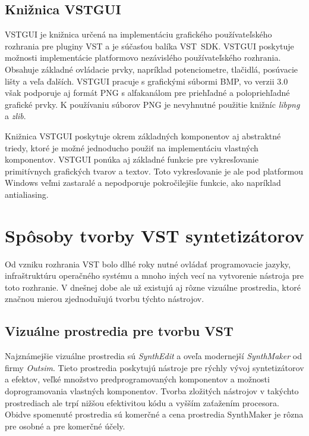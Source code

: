 \subsection{Knižnica VSTGUI}
VSTGUI je knižnica určená na implementáciu grafického používateľského rozhrania pre pluginy VST a je súčasťou balíka VST~SDK. VSTGUI poskytuje možnosti implementácie platformovo nezávislého používateľského rozhrania. Obsahuje základné ovládacie prvky, napríklad potenciometre, tlačidlá, posúvacie lišty a veľa ďalších. VSTGUI pracuje s grafickými súbormi BMP, vo verzii 3.0 však podporuje aj formát PNG s alfakanálom pre priehľadné a polopriehľadné grafické prvky. K používaniu súborov PNG je nevyhnutné použitie knižníc \emph{libpng} a \emph{zlib}.

Knižnica VSTGUI poskytuje okrem základných komponentov aj abstraktné triedy, ktoré je možné jednoducho použiť na implementáciu vlastných komponentov. VSTGUI ponúka aj základné funkcie pre vykresľovanie primitívnych grafických tvarov a textov. Toto vykresľovanie je ale pod platformou Windows veľmi zastaralé a nepodporuje pokročilejšie funkcie, ako napríklad antialiasing. 

\section{Spôsoby tvorby VST syntetizátorov}

Od vzniku rozhrania VST bolo dlhé roky nutné ovládať programovacie jazyky, infraštruktúru operačného systému a mnoho iných vecí na vytvorenie nástroja pre toto rozhranie. V dnešnej dobe ale už existujú aj rôzne vizuálne prostredia, ktoré značnou mierou zjednodušujú tvorbu týchto nástrojov.

\subsection{Vizuálne prostredia pre tvorbu VST}

Najznámejšie vizuálne prostredia sú \emph{SynthEdit} a oveľa modernejší \emph{SynthMaker} od firmy \emph{Outsim}. Tieto prostredia poskytujú nástroje pre rýchly vývoj syntetizátorov a efektov, veľké množstvo predprogramovaných komponentov a možnosti doprogramovania vlastných komponentov. Tvorba zložitých nástrojov v takýchto prostrediach ale trpí nižšou efektivitou kódu a vyšším zaťažením procesora. Obidve spomenuté prostredia sú komerčné a cena prostredia SynthMaker je rôzna pre osobné a pre komerčné účely.

